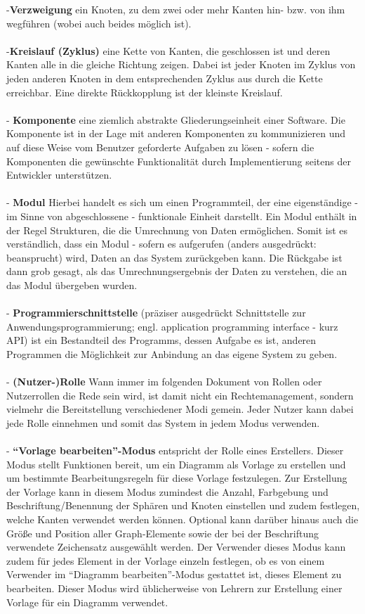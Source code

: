 \documentclass[enabledeprecatedfontcommands,fontsize=11pt,paper=a4,twoside]{scrartcl}
\newcounter{one}
\begin{document}
-\textbf{Verzweigung} ein Knoten, zu dem zwei oder mehr Kanten hin- bzw. von ihm wegführen (wobei auch beides möglich ist). \\ \\
-\textbf{\hypertarget{Kreislauf}{Kreislauf (Zyklus)}} eine Kette von Kanten, die geschlossen ist und deren Kanten alle in die gleiche Richtung zeigen. Dabei ist jeder Knoten im Zyklus von jeden anderen Knoten in dem entsprechenden Zyklus aus durch die Kette erreichbar. Eine direkte Rückkopplung ist der kleinste Kreislauf. \\ \\
- \textbf{Komponente} eine ziemlich abstrakte Gliederungseinheit einer Software. Die Komponente ist in der Lage mit anderen Komponenten zu kommunizieren und auf diese Weise vom Benutzer geforderte Aufgaben zu lösen - sofern die Komponenten die gewünschte Funktionalität durch Implementierung seitens der Entwickler unterstützen. \\ \\
- \textbf{Modul} Hierbei handelt es sich um einen Programmteil, der eine eigenständige - im Sinne von abgeschlossene - funktionale Einheit darstellt. Ein Modul enthält in der Regel Strukturen, die die Umrechnung von Daten ermöglichen. Somit ist es verständlich, dass ein Modul - sofern es aufgerufen (anders ausgedrückt: beansprucht) wird, Daten an das System zurückgeben kann. Die Rückgabe ist dann grob gesagt, als das Umrechnungsergebnis der Daten zu verstehen, die an das Modul übergeben wurden. \\ \\
- \textbf{Programmierschnittstelle} (präziser ausgedrückt Schnittstelle zur Anwendungsprogrammierung; engl. application programming interface - kurz API) ist ein Bestandteil des Programms, dessen Aufgabe es ist, anderen Programmen die Möglichkeit zur Anbindung an das eigene System zu geben.\\ \\
- \textbf{(Nutzer-)Rolle} Wann immer im folgenden Dokument von Rollen oder Nutzerrollen die Rede sein wird, ist damit nicht ein Rechtemanagement, sondern vielmehr die Bereitstellung verschiedener Modi gemein. Jeder Nutzer kann dabei jede Rolle einnehmen und somit das System in jedem Modus verwenden. \\ \\
- \textbf{\hypertarget{``Vorlage bearbeiten''-Modus}{``Vorlage bearbeiten''-Modus}} entspricht der Rolle eines Erstellers. Dieser Modus stellt Funktionen bereit, um ein Diagramm als Vorlage zu erstellen und um bestimmte Bearbeitungsregeln für diese Vorlage festzulegen. Zur Erstellung der Vorlage kann in diesem Modus zumindest die Anzahl, Farbgebung und Beschriftung/Benennung der Sphären und Knoten einstellen und zudem festlegen, welche Kanten verwendet werden können. Optional kann darüber hinaus auch die Größe und Position aller Graph-Elemente sowie der bei der Beschriftung verwendete Zeichensatz ausgewählt werden. Der Verwender dieses Modus kann zudem für jedes Element in der Vorlage einzeln festlegen, ob es von einem Verwender im ``Diagramm bearbeiten''-Modus gestattet ist, dieses Element zu bearbeiten. Dieser Modus wird üblicherweise von Lehrern zur Erstellung einer Vorlage für ein Diagramm verwendet. \\ \\
\end{document}
